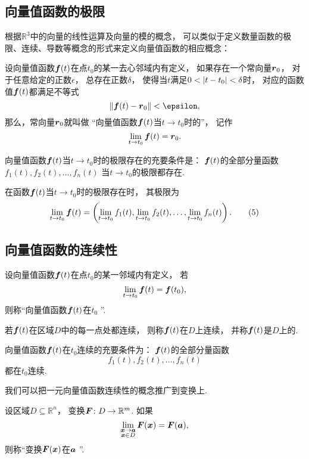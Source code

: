 \subsection{向量值函数的极限}
根据\(\mathbb{R}^3\)中的向量的线性运算及向量的模的概念，
可以类似于定义数量函数的极限、连续、导数等概念的形式来定义向量值函数的相应概念：
\begin{definition}
设向量值函数\(\boldsymbol{f}(t)\)在点\(t_0\)的某一去心邻域内有定义，
如果存在一个常向量\(\boldsymbol{r}_0\)，
对于任意给定的正数\(\epsilon\)，
总存在正数\(\delta\)，
使得当\(t\)满足\(0 < \abs{t-t_0} < \delta\)时，
对应的函数值\(\boldsymbol{f}(t)\)都满足不等式\[
	\norm{\vb{f}(t)-\vb{r}_0} < \epsilon,
\]
那么，常向量\(\boldsymbol{r}_0\)就叫做
“向量值函数\(\boldsymbol{f}(t)\)当\(t \to t_0\)时的”，
记作\[
	\lim_{t \to t_0} \boldsymbol{f}(t) = \boldsymbol{r}_0.
\]
\end{definition}

\begin{theorem}
向量值函数\(\boldsymbol{f}(t)\)当\(t \to t_0\)时的极限存在的充要条件是：
\(\boldsymbol{f}(t)\)的全部分量函数\(f_1(t),f_2(t),\dotsc,f_n(t)\)
当\(t \to t_0\)的极限都存在.

在函数\(\boldsymbol{f}(t)\)当\(t \to t_0\)时的极限存在时，
其极限为\begin{gather}
	\lim_{t \to t_0} \vb{f}(t)
	= \left(
			\lim_{t \to t_0} f_1(t),
			\lim_{t \to t_0} f_2(t),
			\dotsc,
			\lim_{t \to t_0} f_n(t)
		\right).
	\tag5
\end{gather}
\end{theorem}

\subsection{向量值函数的连续性}
\begin{definition}[向量值函数的连续性]
设向量值函数\(\boldsymbol{f}(t)\)在点\(t_0\)的某一邻域内有定义，
若\[
	\lim_{t \to t_0} \boldsymbol{f}(t) = \boldsymbol{f}(t_0),
\]
则称“向量值函数\(\boldsymbol{f}(t)\)在\(t_0\) ”.

若\(\boldsymbol{f}(t)\)在区域\(D\)中的每一点处都连续，
则称\(\boldsymbol{f}(t)\)在\(D\)上连续，
并称\(\boldsymbol{f}(t)\)是\(D\)上的.
\end{definition}

\begin{theorem}
向量值函数\(\boldsymbol{f}(t)\)在\(t_0\)连续的充要条件为：
\(\boldsymbol{f}(t)\)的全部分量函数\[
	f_1(t),f_2(t),\dotsc,f_n(t)
\]都在\(t_0\)连续.
\end{theorem}

我们可以把一元向量值函数连续性的概念推广到变换上.
\begin{definition}
设区域\(D \subseteq \mathbb{R}^n\)，
变换\(\boldsymbol{F}\colon D \to \mathbb{R}^m\).
如果\[
	\lim_{\substack{
		\boldsymbol{x}\to\boldsymbol{a} \\
		\boldsymbol{x} \in D
	}} \boldsymbol{F}(\boldsymbol{x})
	= \boldsymbol{F}(\boldsymbol{a}),
\]
则称“变换\(\boldsymbol{F}(\boldsymbol{x})\)在\(\boldsymbol{a}\) ”.
\end{definition}

